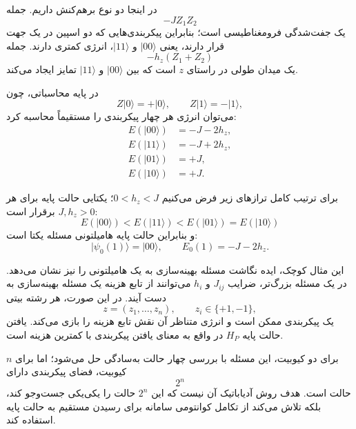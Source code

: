 در اینجا دو نوع برهم‌کنش داریم. جمله
\begin{equation}
	-JZ_1Z_2
\end{equation}
یک جفت‌شدگی فرومغناطیسی است؛ بنابراین پیکربندی‌هایی که دو اسپین در یک جهت قرار دارند، یعنی $\lvert00\rangle$ و $\lvert11\rangle$، انرژی کمتری دارند. جمله
\begin{equation}
	-h_z(Z_1+Z_2)
\end{equation}
یک میدان طولی در راستای $z$ است که بین $\lvert00\rangle$ و $\lvert11\rangle$ تمایز ایجاد می‌کند.

در پایه محاسباتی، چون
\begin{equation}
	Z\lvert0\rangle=+\lvert0\rangle,
	\qquad
	Z\lvert1\rangle=-\lvert1\rangle,
\end{equation}
می‌توان انرژی هر چهار پیکربندی را مستقیماً محاسبه کرد:
\begin{equation}
	\begin{aligned}
		E(\lvert00\rangle)
		&=-J-2h_z,\\
		E(\lvert11\rangle)
		&=-J+2h_z,\\
		E(\lvert01\rangle)
		&=+J,\\
		E(\lvert10\rangle)
		&=+J.
	\end{aligned}
\end{equation}

برای ترتیب کامل ترازهای زیر فرض می‌کنیم $0<h_z<J$؛ یکتایی حالت پایه برای هر $J,h_z>0$ برقرار است:
\begin{equation}
	E(\lvert00\rangle)
	<
	E(\lvert11\rangle)
	<
	E(\lvert01\rangle)=E(\lvert10\rangle)
\end{equation}
و بنابراین حالت پایه هامیلتونی مسئله یکتا است:
\begin{equation}
	\label{eq:problem-ground-state}
	\lvert\psi_0(1)\rangle=\lvert00\rangle,
	\qquad
	E_0(1)=-J-2h_z.
\end{equation}

این مثال کوچک، ایده نگاشت مسئله بهینه‌سازی به یک هامیلتونی را نیز نشان می‌دهد. در یک مسئله بزرگ‌تر، ضرایب $J_{ij}$ و $h_i$ می‌توانند از تابع هزینه یک مسئله بهینه‌سازی به دست آیند. در این صورت، هر رشته بیتی
\begin{equation}
	z=(z_1,\ldots,z_n),
	\qquad z_i\in\{+1,-1\},
\end{equation}
یک پیکربندی ممکن است و انرژی متناظر آن نقش تابع هزینه را بازی می‌کند. یافتن حالت پایه $H_P$ در واقع به معنای یافتن پیکربندی با کمترین هزینه است.

برای دو کیوبیت، این مسئله با بررسی چهار حالت به‌سادگی حل می‌شود؛ اما برای $n$ کیوبیت، فضای پیکربندی دارای
\begin{equation}
	2^n
\end{equation}
حالت است. هدف روش آدیاباتیک آن نیست که این $2^n$ حالت را یکی‌یکی جست‌وجو کند، بلکه تلاش می‌کند از تکامل کوانتومی سامانه برای رسیدن مستقیم به حالت پایه استفاده کند.

